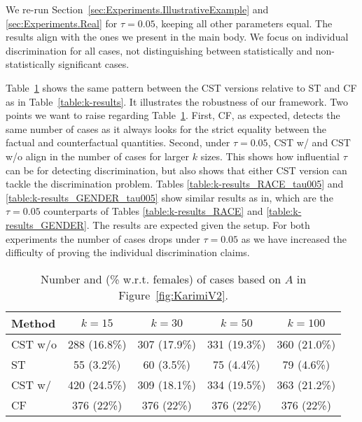 We re-run Section~\ref{sec:Experiments.IllustrativeExample} and \ref{sec:Experiments.Real} for $\tau=0.05$, keeping all other parameters equal.
The results align with the ones we present in the main body. 
We focus on individual discrimination for all cases, not distinguishing between statistically and non-statistically significant cases.

Table~\ref{table:k-results_tau005} shows the same pattern between the CST versions relative to ST and CF as in Table~\ref{table:k-results}.
It illustrates the robustness of our framework. 
Two points we want to raise regarding Table~\ref{table:k-results_tau005}. 
First, CF, as expected, detects the same number of cases as it always looks for the strict equality between the factual and counterfactual quantities.
Second, under $\tau=0.05$, CST w/ and CST w/o align in the number of cases for larger $k$ sizes. This shows how influential $\tau$ can be for detecting discrimination, but also shows that either CST version can tackle the discrimination problem.
%
Tables \ref{table:k-results_RACE_tau005} and \ref{table:k-results_GENDER_tau005} show similar results as in, which are the $\tau=0.05$ counterparts of Tables \ref{table:k-results_RACE} and \ref{table:k-results_GENDER}. 
The results are expected given the setup. 
For both experiments the number of cases drops under $\tau=0.05$ as we have increased the difficulty of proving the individual discrimination claims.

%
\begin{table}[H]
  \caption{Number and (\% w.r.t. females) of cases based on $A$ in Figure~\ref{fig:KarimiV2}.}
  \label{table:k-results_tau005}
  \centering
  \begin{tabular}{lcccc}
    \toprule
    Method & $k=15$ & $k=30$ & $k=50$ & $k=100$ \\
    \midrule
    CST w/o & 288 (16.8\%) & 307 (17.9\%) & 331 (19.3\%) & 360 (21.0\%)  \\
    ST & 55 (3.2\%) & 60 (3.5\%) & 75 (4.4\%) & 79 (4.6\%) \\
    CST w/ & 420 (24.5\%) & 309 (18.1\%) & 334 (19.5\%) & 363 (21.2\%)  \\
    CF &  376 (22\%) &  376 (22\%) &  376 (22\%) & 376 (22\%)  \\
    \bottomrule
  \end{tabular}
\end{table}
%

